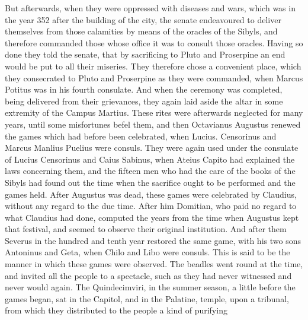But afterwards, when they were oppressed with diseases and wars, which was in the year 352 after the building of the city, the senate endeavoured to deliver themselves from those calamities by means of the oracles of the Sibyls, and therefore commanded those whose office it was to consult those oracles. Having so done they told the senate, that by sacrificing to Pluto and Proserpine an end would be put to all their miseries. They therefore chose a convenient place, which they consecrated to Pluto and Proserpine as they were commanded, when Marcus Potitus was in his fourth consulate. And when the ceremony was completed, being delivered from their grievances, they again laid aside the altar in some extremity of the Campus Martius. These rites were afterwards neglected for many years, until some misfortunes befel them, and then Octavianus Augustus renewed the games which had before been celebrated, when Lucius. Censorinus and Marcus Manlius Puelius were consuls. They were again used under the consulate of Lucius Censorinus and Caius Sabinus, when Ateius Capito had explained the laws concerning them, and the fifteen men who had the care of the books of the Sibyls had found out the time when the sacrifice ought to be performed and the games held. After Augustus was dead, these games were celebrated by Claudius, without any regard to the due time. After him Domitian, who paid no regard to what Claudius had done, computed the years from the time when Augustus kept that festival, and seemed to observe their original institution. And after them Severus in the hundred and tenth year restored the same game, with his two sons Antoninus and Geta, when Chilo and Libo were consuls. This is said to be the manner in which these games were observed. The beadles went round at the time, and invited all the people to a spectacle, such as they had never witnessed and never would again. The Quindecimviri, in the summer season, a little before the games began, sat in the Capitol, and in the Palatine, temple, upon a tribunal, from which they distributed to the people a kind of purifying
